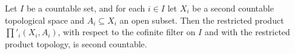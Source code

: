 Let $I$ be a countable set, and for each $i\in I$ let $X_i$ be a second countable topological space and $A_i\subseteq X_i$
an open subset. Then the restricted product $\prod'_i(X_i,A_i)$, with respect to the cofinite filter on $I$ and with the
restricted product topology, is second countable.
